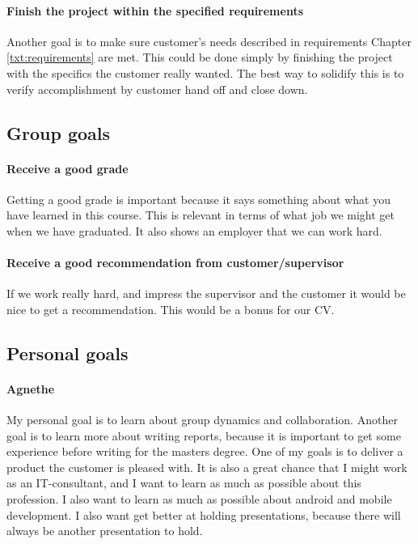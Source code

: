 \paragraph{Finish the project within the specified requirements}
Another goal is to make sure customer's needs described in requirements Chapter \ref{txt:requirements} are met.
This could be done simply by finishing the project with the specifics the customer really wanted. 
The best way to solidify this is to verify accomplishment by customer hand off and close down.

\subsection{Group goals}
\paragraph{Receive a good grade}
Getting a good grade is important because it says something about what you have learned in this course. 
This is relevant in terms of what job we might get when we have graduated. It also shows an employer that we can work hard. 
\paragraph{Receive a good recommendation from customer/supervisor}
If we work really hard, and impress the supervisor and the customer it would be nice to get a recommendation. This would be a bonus for our CV.

\subsection{Personal goals}
\paragraph{Agnethe}

My personal goal is to learn about group dynamics and collaboration. Another goal is to learn more about writing reports, because it is important to get some experience before writing for the masters degree. One of my goals is to deliver a product the customer is pleased with. It is also a great chance that I might work as an IT-consultant, and I want to learn as much as possible about this profession. I also want to learn as much as possible about android and mobile development. I also want get better at holding presentations, because there will always be another presentation to hold. 

